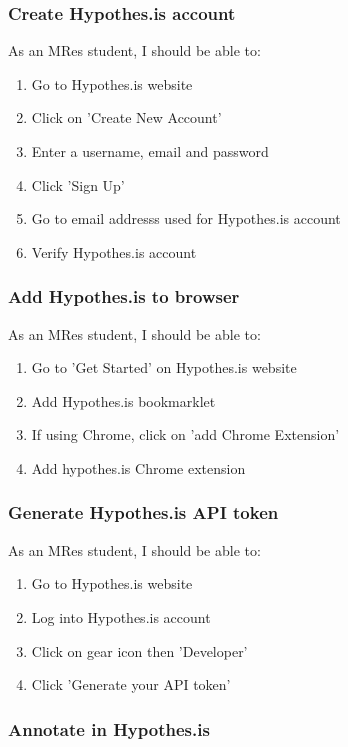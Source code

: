 \documentclass{article}
\begin{document}
\subsubsection*{Create Hypothes.is account}

As an MRes student, I should be able to:
\begin{enumerate}
\item Go to Hypothes.is website
\item Click on 'Create New Account'
\item Enter a username, email and password
\item Click 'Sign Up'
\item Go to email addresss used for Hypothes.is account
\item Verify Hypothes.is account
\end{enumerate}

\subsubsection*{Add Hypothes.is to browser}

As an MRes student, I should be able to:
\begin{enumerate}
\item Go to 'Get Started' on Hypothes.is website
\item Add Hypothes.is bookmarklet
\item If using Chrome, click on 'add Chrome Extension'
\item Add hypothes.is Chrome extension
\end{enumerate}

\subsubsection*{Generate Hypothes.is API token}
As an MRes student, I should be able to:
\begin{enumerate}
\item Go to Hypothes.is website
\item Log into Hypothes.is account
\item Click on gear icon then 'Developer'
\item Click 'Generate your API token'
\end{enumerate}

\subsubsection*{Annotate in Hypothes.is}
\end{document}

